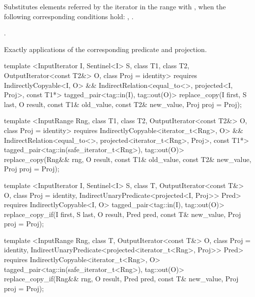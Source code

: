 \begin{itemdescr}
\pnum
\effects
Substitutes elements referred by the iterator
in the range 
with ,
when the following corresponding conditions hold:
,
.

\pnum
\returns
{}.

\pnum
\complexity
Exactly
applications of the corresponding predicate and projection.
\end{itemdescr}

%
%
\begin{itemdecl}
template <InputIterator I, Sentinel<I> S, class T1, class T2, OutputIterator<const T2&> O,
    class Proj = identity>
  requires IndirectlyCopyable<I, O> &&
    IndirectRelation<equal_to<>, projected<I, Proj>, const T1*>
  tagged_pair<tag::in(I), tag::out(O)>
    replace_copy(I first, S last, O result, const T1& old_value, const T2& new_value,
                 Proj proj = Proj{});

template <InputRange Rng, class T1, class T2, OutputIterator<const T2&> O,
    class Proj = identity>
  requires IndirectlyCopyable<iterator_t<Rng>, O> &&
    IndirectRelation<equal_to<>, projected<iterator_t<Rng>, Proj>, const T1*>
  tagged_pair<tag::in(safe_iterator_t<Rng>), tag::out(O)>
    replace_copy(Rng&& rng, O result, const T1& old_value, const T2& new_value,
                 Proj proj = Proj{});

template <InputIterator I, Sentinel<I> S, class T, OutputIterator<const T&> O,
    class Proj = identity, IndirectUnaryPredicate<projected<I, Proj>> Pred>
  requires IndirectlyCopyable<I, O>
  tagged_pair<tag::in(I), tag::out(O)>
    replace_copy_if(I first, S last, O result, Pred pred, const T& new_value,
                    Proj proj = Proj{});

template <InputRange Rng, class T, OutputIterator<const T&> O, class Proj = identity,
    IndirectUnaryPredicate<projected<iterator_t<Rng>, Proj>> Pred>
  requires IndirectlyCopyable<iterator_t<Rng>, O>
  tagged_pair<tag::in(safe_iterator_t<Rng>), tag::out(O)>
    replace_copy_if(Rng&& rng, O result, Pred pred, const T& new_value,
                    Proj proj = Proj{});
\end{itemdecl}

